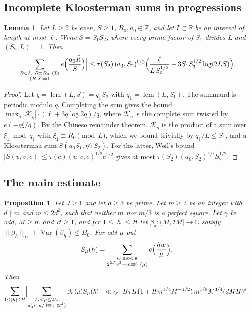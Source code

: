\documentclass[11pt]{amsart}
\newtheorem{proposition}[theorem]{Proposition}
\newtheorem{lemma}[theorem]{Lemma}
\theoremstyle{remark}
\theoremstyle{definition}
\numberwithin{equation}{section}
\newcommand{\Z}{\mathbb{Z}}
\newcommand{\R}{\mathbb{R}}
\newcommand{\eps}{\varepsilon}
\newcommand{\Var}{\operatorname{Var}}
\newcommand{\lcm}{\operatorname{lcm}}
\begin{document}
\subsection{Incomplete Kloosterman sums in progressions}

\begin{lemma}\label{lem:kloost}
Let $L\ge2$ be even, $S\ge1$, $R_0,a_0\in\Z$, and let $I\subset\R$ be an interval of length at most $\ell$. Write $S=S_1S_2$, where every prime factor of $S_1$ divides $L$ and $(S_2,L)=1$. Then
\[
\Bigl|\sum_{\substack{R\in I,\ R\equiv R_0\ (L)\\ (R,S)=1}}e\Bigl(\frac{a_0\bar R}{S}\Bigr)\Bigr|\le\tau(S_2)\,(a_0,S_2)^{1/2}\Bigl(\frac{\ell}{L\,S_2^{1/2}}+3S_1S_2^{1/2}\log(2LS)\Bigr).
\]
\end{lemma}

\begin{proof}
Let $q=\lcm(L,S)=q_1S_2$ with $q_1=\lcm(L,S_1)$. The summand is periodic modulo $q$. Completing the sum gives the bound $\max_{\eta}|\mathcal K_\eta|\cdot(\ell+3q\log2q)/q$, where $\mathcal K_\eta$ is the complete sum twisted by $e(-\eta\xi/q)$. By the Chinese remainder theorem, $\mathcal K_\eta$ is the product of a sum over $\xi_1\bmod q_1$ with $\xi_1\equiv R_0\pmod L$, which we bound trivially by $q_1/L\le S_1$, and a Kloosterman sum $S(a_0\overline{S_1},\eta';S_2)$. For the latter, Weil's bound $|S(u,v;c)|\le\tau(c)(u,v,c)^{1/2}c^{1/2}$ \cite[Cor.~11.12]{IK} gives at most $\tau(S_2)(a_0,S_2)^{1/2}S_2^{1/2}$.
\end{proof}

\subsection{The main estimate}

\begin{proposition}\label{prop:weyl}
Let $J\ge1$ and let $d\ge3$ be prime. Let $m\ge2$ be an integer with $d\nmid m$ and $m\le2d^2$, such that neither $m$ nor $m/3$ is a perfect square. Let $\gamma$ be odd, $M\ge m$ and $H\ge1$, and for $1\le|h|\le H$ let $\beta_h:(M,2M]\to\mathbb C$ satisfy $\|\beta_h\|_\infty+\Var(\beta_h)\le B_0$. For odd $\mu$ put
\[
S_\mu(h)=\sum_{\substack{w\bmod\mu\\ 2^{2J}w^2+m\equiv0\ (\mu)}}e\Bigl(\frac{hw}{\mu}\Bigr).
\]
Then
\[
\sum_{1\le|h|\le H}\Bigl|\sum_{\substack{M<\mu\le2M\\ d\mid\mu,\ \mu/d\equiv\gamma\ (2^J)}}\beta_h(\mu)S_\mu(h)\Bigr|\ \ll_{J,\eps}\ B_0\,H\bigl(1+Hm^{1/4}M^{-1/2}\bigr)\,m^{1/8}M^{3/4}(dMH)^{\eps}.
\]
\end{proposition}
\end{document}
